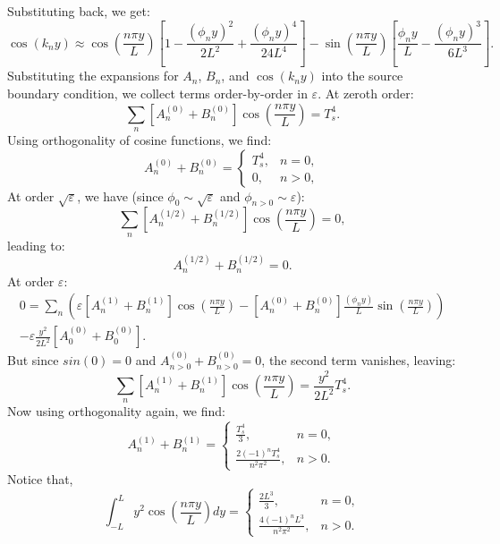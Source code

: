 \documentclass{article}
\begin{document}
Substituting back, we get:
\[
\cos(k_n y) \approx
\cos\!\left(\frac{n\pi y}{L}\right)
\left[1 - \frac{(\phi_n y)^2}{2L^2} + \frac{(\phi_n y)^4}{24L^4}\right]
- \sin\!\left(\frac{n\pi y}{L}\right)
\left[\frac{\phi_n y}{L} - \frac{(\phi_n y)^3}{6L^3}\right].
\]
Substituting the expansions for $A_n$, $B_n$, and $\cos(k_n y)$ into the source boundary condition, we collect terms order-by-order in $\varepsilon$.
At zeroth order:
\[
\sum_n \left[A_n^{(0)} + B_n^{(0)}\right] \cos\!\left(\frac{n\pi y}{L}\right) = T_s^4.
\]
Using orthogonality of cosine functions, we find:
\begin{equation}
A_n^{(0)} + B_n^{(0)} =
\begin{cases}
T_s^4, & n=0,\\
0, & n>0,
\end{cases}
\end{equation}
At order $\sqrt{\varepsilon}$, we have (since $\phi_0 \sim \sqrt{\varepsilon}$ and $\phi_{n>0} \sim \varepsilon$):
\[
\sum_n \left[A_n^{(1/2)} + B_n^{(1/2)}\right] \cos\!\left(\frac{n\pi y}{L}\right) = 0,
\]
leading to:
\begin{equation}
A_n^{(1/2)} + B_n^{(1/2)} = 0.
\end{equation}
At order $\varepsilon$:
\begin{equation}
    \begin{split}
        0 = \sum_n \left(\varepsilon\left[A_n^{(1)} + B_n^{(1)}\right] \cos\!\left(\frac{n\pi y}{L}\right)
        - \left[A_n^{(0)} + B_n^{(0)}\right]\frac{(\phi_n y)}{L}\sin\!\left(\frac{n\pi y}{L}\right)\right) \\
        - \varepsilon\frac{y^2}{2L^2}\left[A_0^{(0)} + B_0^{(0)}\right].
    \end{split}
\end{equation}
But since $sin(0)=0$ and $A_{n>0}^{(0)} + B_{n>0}^{(0)}=0$, the second term vanishes, leaving:
\[
\sum_n \left[A_n^{(1)} + B_n^{(1)}\right] \cos\!\left(\frac{n\pi y}{L}\right)
= \frac{y^2}{2L^2} T_s^4.
\]
Now using orthogonality again, we find:
\begin{equation}
A_n^{(1)} + B_n^{(1)} =
\begin{cases}
\displaystyle \frac{T_s^4}{3}, & n=0,\\[6pt]
\displaystyle \frac{2(-1)^n T_s^4}{n^2\pi^2}, & n>0.
\end{cases}
\end{equation}
Notice that, 
\[
\int_{-L}^{L} y^2 \cos\!\left(\frac{n\pi y}{L}\right) dy =
\begin{cases}
\displaystyle \frac{2L^3}{3}, & n=0,\\[6pt]
\displaystyle \frac{4(-1)^n L^3}{n^2\pi^2}, & n>0.
\end{cases}
\]
\end{document}
